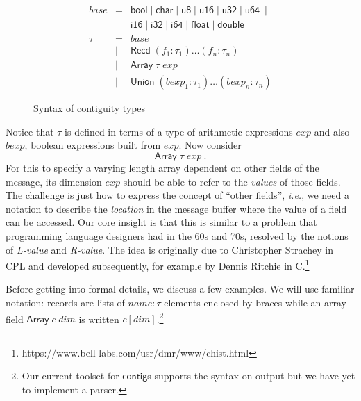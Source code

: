 \documentclass[sigplan,10pt,anonymous,review]{acmart}\settopmatter{printfolios=true,printccs=false,printacmref=false}
\newcommand{\ie}{\textit{i.e.}}
\newcommand{\konst}[1]{\ensuremath{\mathsf{#1}}}
\begin{document}
\begin{figure}
\label{contig-types}
\[
\begin{array}{rcl}
 \mathit{base} & = & \konst{bool} \mid \konst{char} \mid \konst{u8} \mid
 \konst{u16} \mid \konst{u32} \mid \konst{u64}  \ \mid \\
 & & \konst{i16} \mid \konst{i32} \mid \konst{i64} \mid \konst{float} \mid \konst{double} \\
 \tau & = & \mathit{base} \\
      & \mid & \konst{Recd}\; (f_1 : \tau_1) \ldots (f_n : \tau_n) \\
      & \mid & \konst{Array}\; \tau \; \mathit{exp} \\
      & \mid & \konst{Union}\; (\mathit{bexp}_1 : \tau_1) \ldots (\mathit{bexp}_n : \tau_n)
\end{array}
\]
\caption{Syntax of contiguity types}
\end{figure}

Notice that $\tau$ is defined in terms of a type of arithmetic
expressions $\mathit{exp}$ and also $\mathit{bexp}$, boolean
expressions built from $\mathit{exp}$. Now consider
\[
 \konst{Array} \; \tau \; \mathit{exp} \ .
\]
For this to specify a varying length array dependent on
other fields of the message, its dimension $\mathit{exp}$ should be
able to refer to the \emph{values} of those fields. The challenge is
just how to express the concept of ``other fields'', \ie, we need a
notation to describe the \emph{location} in the message buffer where
the value of a field can be accessed. Our core insight is that this is
similar to a problem that programming language designers had in the
60s and 70s, resolved by the notions of \emph{L-value} and
\emph{R-value}. The idea is originally due to Christopher Strachey in
CPL and developed subsequently, for example by Dennis Ritchie in
C.\footnote{https://www.bell-labs.com/usr/dmr/www/chist.html}

Before getting into formal details, we discuss a few examples.  We
will use familiar notation: records are lists of $\mathit{name} :
\tau$ elements enclosed by braces while an array field
$\konst{Array}\;c\;\mathit{dim}$ is written
$c [\mathit{dim}]$.\footnote{Our current toolset for \konst{contig}s supports
the syntax on output but we have yet to implement a parser.}
\end{document}
